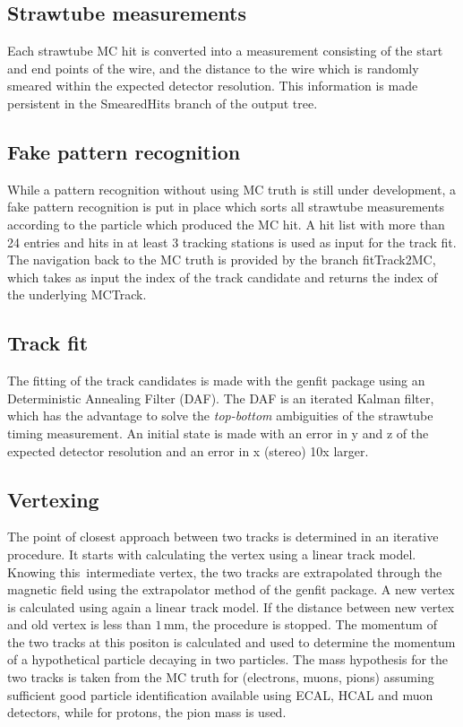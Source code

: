 \documentclass[12pt,a4paper]{article}
\begin{document}
\subsection{Strawtube measurements}
Each strawtube MC hit is converted into a measurement consisting of the start and end points of the wire, and the distance to the wire which is randomly smeared within the expected detector resolution. This information is made persistent in the SmearedHits branch of the output tree.  
\subsection{Fake pattern recognition}
While a pattern recognition without using MC truth is still under development, a fake pattern recognition is put in place which sorts all strawtube measurements according to the particle which produced the MC hit. A hit list with more than 24 entries and hits in at least 3 tracking stations is used as input for the track fit. The navigation back to the MC truth is provided by the branch fitTrack2MC, which takes as input the index of the track candidate and returns the index of the underlying MCTrack.   

\subsection{Track fit}
The fitting of the track candidates is made with the genfit package using an Deterministic Annealing Filter (DAF). The DAF is an iterated Kalman filter, which has the advantage to solve the {\em top-bottom} ambiguities of the strawtube timing measurement. An initial state is made with an error in y and z of the expected detector resolution and an error in x (stereo) 10x larger. 

\subsection{Vertexing}
The point of closest approach between two tracks is determined in an iterative procedure. It starts with calculating the vertex using a linear track model. Knowing this intermediate vertex, the two tracks are extrapolated through the magnetic field using the extrapolator method of the genfit package. A new vertex is calculated using again a linear track model. If the distance between new vertex and old vertex is less than $1\,$mm, the procedure is stopped. The momentum of the two tracks at this positon is calculated and used to determine the momentum of a hypothetical particle decaying in two particles. The mass hypothesis for the two tracks is taken from the MC truth for (electrons, muons, pions) assuming sufficient good particle identification available using ECAL, HCAL and muon detectors, while for protons, the pion mass is used.    
\end{document}
